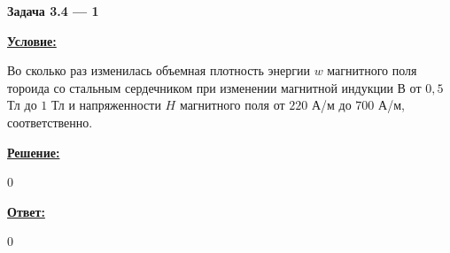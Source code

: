 
\begin{center}
    \textbf{Задача 3.4 --- 1}
\end{center}

\underline{\textbf{Условие:}}

Во сколько раз изменилась объемная плотность энергии 
$ w $ магнитного поля тороида со 
стальным сердечником при изменении магнитной индукции 
$ В $ от $ 0,5 $ Тл до $ 1 $ Тл и напряженности 
$ H $ магнитного поля от 
$ 220 $ А/м до $ 700 $ А/м, соответственно.

\underline{\textbf{Решение:}}

0

\underline{\textbf{Ответ:}}

0
